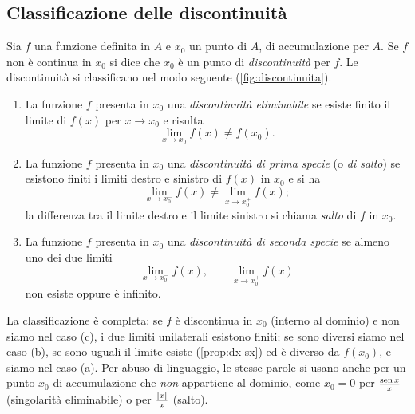 \subsection{Classificazione delle discontinuità}

Sia $f$ una funzione definita in $A$ e $x_{0}$ un punto di $A$, di accumulazione per $A$.
Se $f$ non è continua in $x_{0}$ si dice che $x_{0}$ è un punto di \emph{discontinuità}
per $f$. Le discontinuità si classificano nel modo seguente
(\cref{fig:discontinuita}).

\begin{definizione}\label{def:discontinuita}
\begin{enumerate}[label=\textup{(\alph*)}]
  \item La funzione $f$ presenta in $x_{0}$ una \emph{discontinuità eliminabile} se
  esiste finito il limite di $f(x)$ per $x\to x_{0}$ e risulta
  \begin{equation}\label{eq:disc-eliminabile}
    \lim_{x\to x_{0}}f(x)\neq f(x_{0}) .
  \end{equation}
  \item La funzione $f$ presenta in $x_{0}$ una \emph{discontinuità di prima specie} (o
  \emph{di salto}) se esistono finiti i limiti destro e sinistro di $f(x)$ in $x_{0}$ e
  si ha
  \begin{equation}\label{eq:disc-prima-specie}
    \lim_{x\to x_{0}^{-}}f(x)\neq\lim_{x\to x_{0}^{+}}f(x);
  \end{equation}
  la differenza tra il limite destro e il limite sinistro si chiama \emph{salto} di $f$
  in $x_{0}$.
  \item La funzione $f$ presenta in $x_{0}$ una \emph{discontinuità di seconda specie}
  se almeno uno dei due limiti
  \begin{equation}\label{eq:disc-seconda-specie}
    \lim_{x\to x_{0}^{-}}f(x), \qquad \lim_{x\to x_{0}^{+}}f(x)
  \end{equation}
  non esiste oppure è infinito.
\end{enumerate}
\end{definizione}

La classificazione è completa: se $f$ è discontinua in $x_{0}$ (interno al dominio) e
non siamo nel caso (c), i due limiti unilaterali esistono finiti; se sono diversi siamo
nel caso (b), se sono uguali il limite esiste (\cref{prop:dx-sx}) ed è diverso da
$f(x_{0})$, e siamo nel caso (a). Per abuso di linguaggio, le stesse parole si usano
anche per un punto $x_{0}$ di accumulazione che \emph{non} appartiene al dominio, come
$x_{0}=0$ per $\frac{\operatorname{sen} x}{x}$ (singolarità eliminabile) o per $\frac{\lvert x\rvert}{x}$
(salto).

